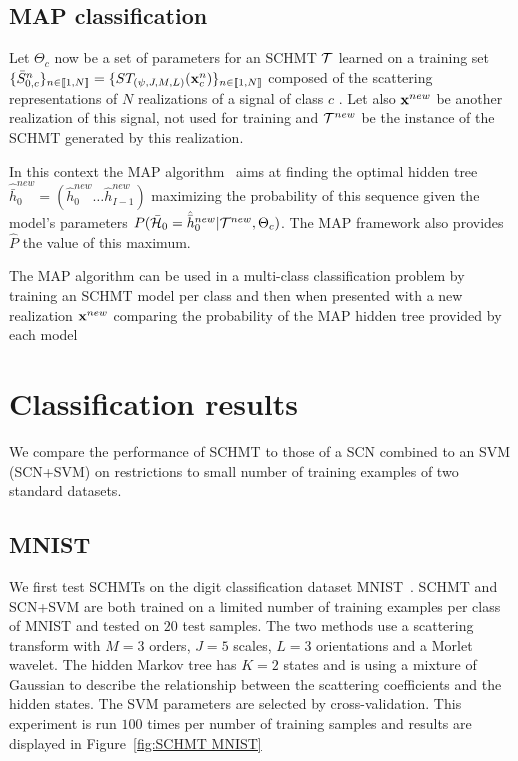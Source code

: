 \documentclass{article}
\begin{document}
	\subsection{MAP classification}
    \label{subsec:SCN/SCC}
    
     Let $\Theta_{c}$ now be a set of parameters for an SCHMT $\mathcal{T}$ learned on a training set $\{\bar{S}_{0,c}^n\}_{n \in \llbracket1, N \rrbracket} = \{ST_{(\psi, J, M, L)}({\bf x}_{c}^{n})\}_{n \in \llbracket1, N \rrbracket}$ composed of the scattering representations of $N$ realizations of a signal of class $c$ . Let also ${\bf x}^{new}$ be another realization of this signal, not used for training and $\mathcal{T}^{new}$ be the instance of the SCHMT generated by this realization.
     
     In this context the MAP algorithm~\citep{Durand} aims at finding the optimal hidden tree $\hat{\bar{h}}_{0}^{new}=(\hat{h}_{0}^{new} \dots \hat{h}_{I-1}^{new})$ maximizing the probability of this sequence given the model's parameters $P(\bar{\mathcal{H}}_{0}= \hat{\bar{h}}_{0}^{new}|\mathcal{T}^{new},\Theta_{c})$. The MAP framework also provides $\hat{P}$ the value of this maximum.
    
    The MAP algorithm can be used in a multi-class classification problem by training an SCHMT model per class and then when presented with a new realization ${\bf x}^{new}$ comparing the probability of the MAP hidden tree provided by each model
    
\section{Classification results}
  \label{sec:Exps}
  
  We compare the performance of SCHMT to those of a SCN combined to an SVM (SCN+SVM) on restrictions to small number of training examples of two standard datasets. 
  
  \subsection{MNIST}
		\label{subsec:Exps/MNIST}
		We first test SCHMTs on the digit classification dataset MNIST~\citep{MNIST}. SCHMT and SCN+SVM are both trained on a limited number of training examples per class of MNIST and tested on $20$ test samples. The two methods use a scattering transform with $M=3$ orders, $J=5$ scales, $L=3$ orientations and a Morlet wavelet. The hidden Markov tree has $K=2$ states and is using a mixture of Gaussian to describe the relationship between the scattering coefficients and the hidden states. The SVM parameters are selected by cross-validation. This experiment is run $100$ times per number of training samples and results are displayed in Figure~\ref{fig:SCHMT MNIST} 
\end{document}

